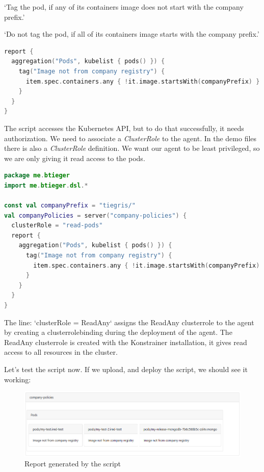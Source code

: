 `Tag the pod, if any of its containers image does not start with the company prefix.'

`Do not tag the pod, if all of its containers image starts with the company prefix.'

\begin{lstlisting}[caption={Tag pods},language=Kotlin,label=code:todo]
report {
  aggregation("Pods", kubelist { pods() }) {
    tag("Image not from company registry") {
      item.spec.containers.any { !it.image.startsWith(companyPrefix) }
    }
  }
}
\end{lstlisting}

The script accesses the Kubernetes API, but to do that successfully, it needs authorization. We need to associate a \emph{ClusterRole} to the agent. In the demo files there is also a \emph{ClusterRole} definition. We want our agent to be least privileged, so we are only giving it read access to the pods.

\begin{lstlisting}[caption={TODO},language=Kotlin,label=code:todo]
package me.btieger
import me.btieger.dsl.*

const val companyPrefix = "tiegris/"
val companyPolicies = server("company-policies") {
  clusterRole = "read-pods"
  report {
    aggregation("Pods", kubelist { pods() }) {
      tag("Image not from company registry") {
        item.spec.containers.any { !it.image.startsWith(companyPrefix) }
      }
    }
  }
}
\end{lstlisting}

The line: `clusterRole = ReadAny` assigns the ReadAny clusterrole to the agent by creating a clusterrolebinding during the deployment of the agent. The ReadAny clusterrole is created with the Konstrainer installation, it gives read access to all resources in the cluster.

Let's test the script now. If we upload, and deploy the script, we should see it working:

\begin{figure}[h]
  \centering
  \includegraphics[width=130mm, keepaspectratio]{content/60_caseStudy2/company_policies_1.png}
  \caption{Report generated by the script}
  \label{fig:comp_arch}
\end{figure}


